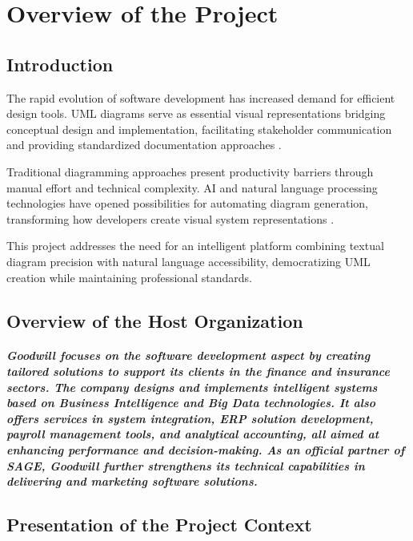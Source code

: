 \chapter[Overview]{Overview of the Project}

\minitoc

\section{Introduction}

The rapid evolution of software development has increased demand for efficient design tools. UML diagrams serve as essential visual representations bridging conceptual design and implementation, facilitating stakeholder communication and providing standardized documentation approaches \cite{uml_importance}.

Traditional diagramming approaches present productivity barriers through manual effort and technical complexity. AI and natural language processing technologies have opened possibilities for automating diagram generation, transforming how developers create visual system representations \cite{ai_diagramming}.

This project addresses the need for an intelligent platform combining textual diagram precision with natural language accessibility, democratizing UML creation while maintaining professional standards.

\section{Overview of the Host Organization}
\paragraph{Goodwill focuses on the software development aspect by creating tailored solutions to support its clients in the finance and insurance sectors. The company designs and implements intelligent systems based on Business Intelligence and Big Data technologies. It also offers services in system integration, ERP solution development, payroll management tools, and analytical accounting, all aimed at enhancing performance and decision-making. As an official partner of SAGE, Goodwill further strengthens its technical capabilities in delivering and marketing software solutions.}

\section{Presentation of the Project Context}

